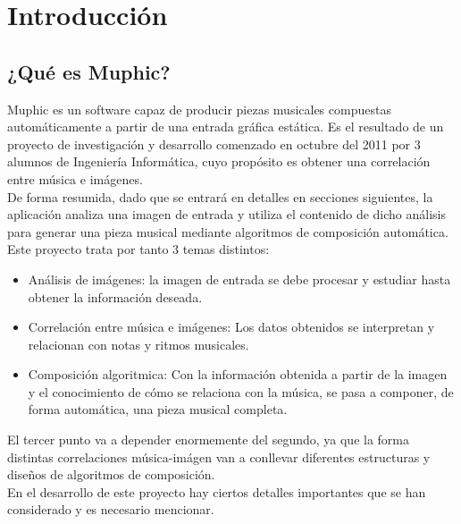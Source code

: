 \section{Introducción}


	\subsection{¿Qué es Muphic?}
	
		\vspace{0.2in}
		Muphic es un software capaz de producir piezas musicales compuestas automáticamente a partir de una entrada gráfica estática. Es el resultado de un proyecto de investigación y desarrollo comenzado en octubre del 2011 por 3 alumnos de Ingeniería Informática, cuyo propósito es obtener una correlación entre música e imágenes.\\
		
		De forma resumida, dado que se entrará en detalles en secciones siguientes, la aplicación analiza una imagen de entrada y utiliza el contenido de dicho análisis para generar una pieza musical mediante algoritmos de composición automática.\\
		
		Este proyecto trata por tanto 3 temas distintos:
		
		\begin{itemize}
		
		\item Análisis de imágenes: la imagen de entrada se debe procesar y estudiar hasta obtener la información deseada.
		\item Correlación entre música e imágenes: Los datos obtenidos se interpretan y relacionan con notas y ritmos musicales.
		\item Composición algoritmica: Con la información obtenida a partir de la imagen y el conocimiento de cómo se relaciona con la música, se pasa a componer, de forma automática, una pieza musical completa.
		\end{itemize}
		
		El tercer punto va a depender enormemente del segundo, ya que la forma distintas correlaciones música-imágen van a conllevar diferentes estructuras y diseños de algoritmos de composición.\\
		
		En el desarrollo de este proyecto hay ciertos detalles importantes que se han considerado y es necesario mencionar.
		
		
